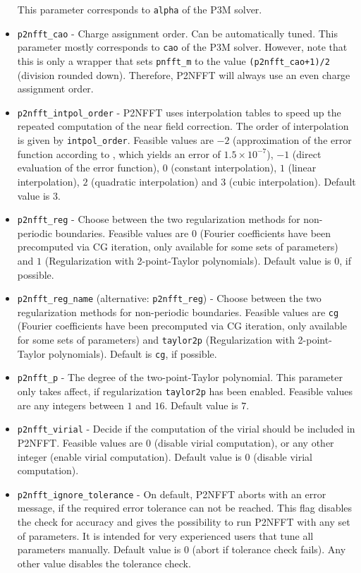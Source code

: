 \begin{itemize}
    This parameter corresponds to \verb!alpha! of the P3M solver.
  \item \verb!p2nfft_cao! -
    Charge assignment order. Can be automatically tuned. This parameter mostly corresponds to \verb!cao! of the P3M solver.
    However, note that this is only a wrapper that sets \verb!pnfft_m! to the value \verb!(p2nfft_cao+1)/2! (division rounded down).
    Therefore, P2NFFT will always use an even charge assignment order.
  \item \verb!p2nfft_intpol_order! -
    P2NFFT uses interpolation tables to speed up the repeated computation of the near field correction. The order of interpolation is given by \verb!intpol_order!.
    Feasible values are $-2$ (approximation of the error function according to \cite[eq.~(7.1.26)]{AbSt72}, which yields an error of $1.5\times 10^{-7}$),
    $-1$ (direct evaluation of the error function), $0$ (constant interpolation), $1$ (linear interpolation), $2$ (quadratic interpolation) and $3$ (cubic interpolation).
    Default value is $3$.
  \item \verb!p2nfft_reg! -
    Choose between the two regularization methods for non-periodic boundaries. Feasible values are $0$ (Fourier coefficients have been precomputed via CG iteration, only available for some sets of parameters)
    and $1$ (Regularization with 2-point-Taylor polynomials). Default value is $0$, if possible.
  \item \verb!p2nfft_reg_name! (alternative: \verb!p2nfft_reg!) -
    Choose between the two regularization methods for non-periodic boundaries. Feasible values are \verb!cg! (Fourier coefficients have been precomputed via CG iteration, only available for some sets of parameters)
    and \verb!taylor2p! (Regularization with 2-point-Taylor polynomials). Default is \verb!cg!, if possible.
  \item \verb!p2nfft_p! -
    The degree of the two-point-Taylor polynomial. This parameter only takes affect, if regularization \verb!taylor2p! has been enabled.
    Feasible values are any integers between $1$ and $16$. Default value is $7$.
  \item \verb!p2nfft_virial! -
    Decide if the computation of the virial should be included in P2NFFT.
    Feasible values are $0$ (disable virial computation), or any other integer (enable virial computation).
    Default value is $0$ (disable virial computation).
  \item \verb!p2nfft_ignore_tolerance! -
    On default, P2NFFT aborts with an error message, if the required error tolerance can not be reached.
    This flag disables the check for accuracy and gives the possibility to run P2NFFT
    with any set of parameters. It is intended for very experienced users that tune all parameters manually.
    Default value is $0$ (abort if tolerance check fails). Any other value disables the tolerance check.
\end{itemize}

